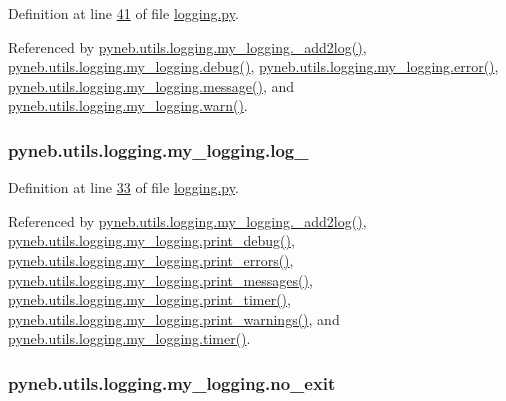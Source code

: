 Definition at line \hyperlink{logging_8py_source_l00041}{41} of file \hyperlink{logging_8py_source}{logging.\-py}.



Referenced by \hyperlink{logging_8py_source_l00059}{pyneb.\-utils.\-logging.\-my\-\_\-logging.\-\_\-add2log()}, \hyperlink{logging_8py_source_l00069}{pyneb.\-utils.\-logging.\-my\-\_\-logging.\-debug()}, \hyperlink{logging_8py_source_l00099}{pyneb.\-utils.\-logging.\-my\-\_\-logging.\-error()}, \hyperlink{logging_8py_source_l00079}{pyneb.\-utils.\-logging.\-my\-\_\-logging.\-message()}, and \hyperlink{logging_8py_source_l00089}{pyneb.\-utils.\-logging.\-my\-\_\-logging.\-warn()}.

\hypertarget{classpyneb_1_1utils_1_1logging_1_1my__logging_a4bda17b594629b5490207080dbcb3bbd}{
\subsubsection[{log\-\_\-}]{\setlength{\rightskip}{0pt plus 5cm}pyneb.\-utils.\-logging.\-my\-\_\-logging.\-log\-\_\-}}\label{classpyneb_1_1utils_1_1logging_1_1my__logging_a4bda17b594629b5490207080dbcb3bbd}


Definition at line \hyperlink{logging_8py_source_l00033}{33} of file \hyperlink{logging_8py_source}{logging.\-py}.



Referenced by \hyperlink{logging_8py_source_l00059}{pyneb.\-utils.\-logging.\-my\-\_\-logging.\-\_\-add2log()}, \hyperlink{logging_8py_source_l00157}{pyneb.\-utils.\-logging.\-my\-\_\-logging.\-print\-\_\-debug()}, \hyperlink{logging_8py_source_l00149}{pyneb.\-utils.\-logging.\-my\-\_\-logging.\-print\-\_\-errors()}, \hyperlink{logging_8py_source_l00133}{pyneb.\-utils.\-logging.\-my\-\_\-logging.\-print\-\_\-messages()}, \hyperlink{logging_8py_source_l00165}{pyneb.\-utils.\-logging.\-my\-\_\-logging.\-print\-\_\-timer()}, \hyperlink{logging_8py_source_l00141}{pyneb.\-utils.\-logging.\-my\-\_\-logging.\-print\-\_\-warnings()}, and \hyperlink{logging_8py_source_l00115}{pyneb.\-utils.\-logging.\-my\-\_\-logging.\-timer()}.

\hypertarget{classpyneb_1_1utils_1_1logging_1_1my__logging_aa84eff388fc826a600e063d8cf7c4f63}{
\subsubsection[{no\-\_\-exit}]{\setlength{\rightskip}{0pt plus 5cm}pyneb.\-utils.\-logging.\-my\-\_\-logging.\-no\-\_\-exit}}\label{classpyneb_1_1utils_1_1logging_1_1my__logging_aa84eff388fc826a600e063d8cf7c4f63}


